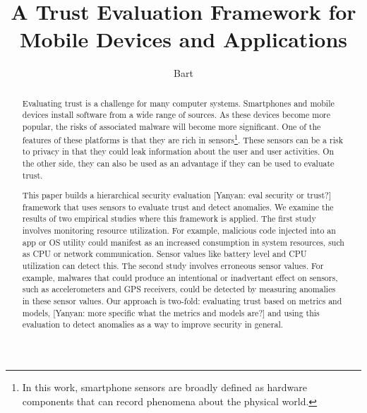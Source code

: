 \documentclass{IEEEtran}
\newcommand{\eat}[1]{}
\newcommand{\sysname}{XXXXXX}
\newcommand{\yanyan}[1]{{\color{blue} [Yanyan: #1]}}
\begin{document}
\title{A Trust Evaluation Framework for Mobile Devices and Applications}
\author{Bart}

\maketitle


\begin{abstract}
Evaluating trust
 is a challenge for many computer systems.  Smartphones and mobile devices install software from a 
wide range of sources.  As these devices become
more popular, the risks of associated malware will become more significant.
One of the features of these platforms is that they are rich in
sensors\footnote{In this work, smartphone sensors are broadly defined as hardware components that can record phenomena about the physical world.}.  These sensors can be a risk to privacy in that they could leak information about the 
user and user activities.  On the other side, they can also be used as an
advantage if they can be used to evaluate trust.

This paper builds  a hierarchical security evaluation 
\yanyan{eval security or trust?} framework 
that uses sensors to evaluate trust and detect anomalies. We examine the results 
of two empirical studies where this framework is applied.  
The first study involves monitoring resource utilization.  For example, malicious code 
injected into an app or OS utility could manifest as an increased consumption in 
system resources, such as CPU or network communication. Sensor values like battery level 
and CPU utilization can detect this.  The second study involves erroneous sensor values. 
For example, malwares that could produce an intentional or inadvertant effect on sensors, such 
as accelerometers and GPS receivers, could be detected by measuring anomalies 
in these sensor values. Our approach is two-fold: evaluating trust based on metrics 
and models, \yanyan{more specific what the metrics and models are?} and 
using this evaluation to detect anomalies as a way to improve security in general.


\eat{For many people, smartphones and other mobile devices serve as a technical interface to the modern world.
These smart devices have embedded on-board sensors, such as accelerometers, gyroscopes, GPS sensors, and
cameras, which are very useful.

This work describes \sysname, a hierarchical framework for checking consistency of sensors 
from multiple devices.  In addition, it relies on Blursense, a dynamic, fine-grained, flexible access
control mechanism, acting as a line of defense that allows users to define and addprivacy filters. 
As a result, the user can expose filtered sensor data to untrusted apps, and researchers can collect 
data in a way that safeguards users' privacy.}  %
\end{abstract}
\end{document}
